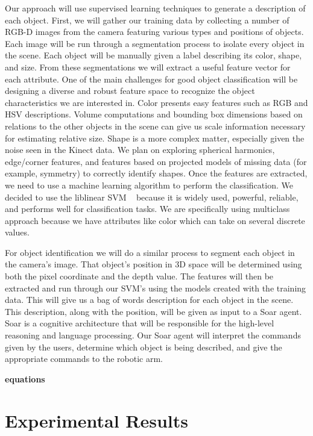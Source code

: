 \documentclass[11pt]{article}
\newcommand{\xxx}[1]{{\bf \color{red} #1}}
\begin{document}
Our approach will use supervised learning techniques to generate a description
of each object. First, we will gather our training data by collecting a number
of RGB-D images from the camera featuring various types and positions of objects.
Each image will be run through a segmentation process to isolate every object in
the scene. Each object will be manually given a label describing its color,
shape, and size. From these segmentations we will extract a useful feature vector
for each attribute. One of the main challenges for good object classification
will be designing a diverse and robust feature space to recognize the object
characteristics we are interested in. Color presents easy features such as RGB
and HSV descriptions. Volume computations and bounding box dimensions based on
relations to the other objects in the scene can give us scale information
necessary for estimating relative size. Shape is a more complex matter,
especially given the noise seen in the Kinect data. We plan on exploring
spherical harmonics, edge/corner features, and features based on projected
models of missing data (for example, symmetry) to correctly identify shapes.
Once the features are extracted, we need to use a machine learning algorithm to
perform the classification. We decided to use the liblinear SVM ~\cite{LIBLINEAR}
because it is widely used, powerful, reliable, and performs well for
classification tasks. We are specifically using multiclass approach because we
have attributes like color which can take on several discrete values.

For object identification we will do a similar process to segment each object in
the camera's image. That object's position in 3D space will be determined using
both the pixel coordinate and the depth value. The features will then be
extracted and run through our SVM's using the models created with the training
data. This will give us a bag of words description for each object in the scene.
This description, along with the position, will be given as input to a Soar
agent. Soar is a cognitive architecture that will be responsible for the
high-level reasoning and language processing. Our Soar agent will interpret the
commands given by the users, determine which object is being described, and give
the appropriate commands to the robotic arm.


\xxx{equations}
\section{Experimental Results}
\end{document}
